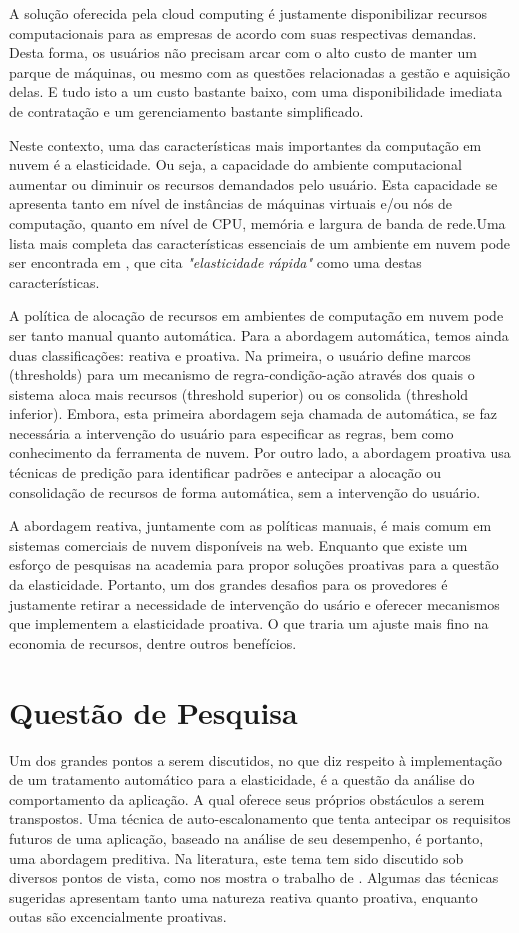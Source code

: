 \documentclass[twoside,english,brazilian]{UNISINOSmonografia}
\begin{document}
A solução oferecida pela cloud computing é justamente disponibilizar recursos computacionais para as empresas de acordo com suas respectivas demandas. Desta forma, os usuários não precisam arcar com o alto custo de manter um parque de máquinas, ou mesmo com as questões relacionadas a gestão e aquisição delas. E tudo isto a um custo bastante baixo, com uma disponibilidade imediata de contratação e um gerenciamento bastante simplificado.

Neste contexto, uma das características mais importantes da computação em nuvem é a elasticidade. Ou seja, a capacidade do ambiente computacional aumentar ou diminuir os recursos demandados pelo usuário. Esta capacidade se apresenta tanto em nível de instâncias de máquinas virtuais e/ou nós de computação, quanto em nível de CPU, memória e largura de banda de rede.Uma lista mais completa das características essenciais de um ambiente em nuvem pode ser encontrada em \cite{coutinho}, que cita \textit{"elasticidade rápida"} como uma destas características.

A política de alocação de recursos em ambientes de computação em nuvem pode ser tanto manual quanto automática. Para a abordagem automática, temos ainda duas classificações: reativa e proativa. Na primeira, o usuário define marcos (thresholds) para um mecanismo de regra-condição-ação através dos quais o sistema aloca mais recursos (threshold superior) ou os consolida (threshold inferior). Embora, esta primeira abordagem seja chamada de automática, se faz necessária a intervenção do usuário para especificar as regras, bem como conhecimento da ferramenta de nuvem. Por outro lado, a abordagem proativa usa técnicas de predição para identificar padrões e antecipar a alocação ou consolidação de recursos de forma automática, sem a intervenção do usuário.

A abordagem reativa, juntamente com as políticas manuais, é mais comum em sistemas comerciais de nuvem disponíveis na web. Enquanto que existe um esforço de pesquisas na academia para propor soluções proativas para a questão da elasticidade. Portanto, um dos grandes desafios para os provedores é justamente retirar a necessidade de intervenção do usário e oferecer mecanismos que implementem a elasticidade proativa. O que traria um ajuste mais fino na economia de recursos, dentre outros benefícios.

\section{Questão de Pesquisa}
Um dos grandes pontos a serem discutidos, no que diz respeito à implementação de um tratamento automático para a elasticidade, é a questão da análise do comportamento da aplicação. A qual oferece seus próprios obstáculos a serem transpostos.
Uma técnica de auto-escalonamento que tenta antecipar os requisitos futuros de uma aplicação, baseado na análise de seu desempenho, é portanto, uma abordagem preditiva. Na literatura, este tema tem sido discutido sob diversos pontos de vista, como nos mostra o trabalho de \cite{Lorido-botr2012}. Algumas das técnicas sugeridas apresentam tanto uma natureza reativa quanto proativa, enquanto outas são excencialmente proativas.
\end{document}
